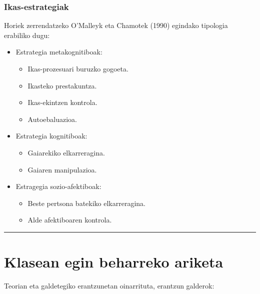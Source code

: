 \documentclass[]{book}
\providecommand{\tightlist}{%
  \setlength{\itemsep}{0pt}\setlength{\parskip}{0pt}}
\begin{document}
\hypertarget{ikas-estrategiak}{%
\subsubsection{Ikas-estrategiak}\label{ikas-estrategiak}}

Horiek zerrendatzeko O'Malleyk eta Chamotek (1990) egindako tipologia erabiliko dugu:

\begin{itemize}
\tightlist
\item
  Estrategia metakognitiboak:

  \begin{itemize}
  \tightlist
  \item
    Ikas-prozesuari buruzko gogoeta.
  \item
    Ikasteko prestakuntza.
  \item
    Ikas-ekintzen kontrola.
  \item
    Autoebaluazioa.
  \end{itemize}
\item
  Estrategia kognitiboak:

  \begin{itemize}
  \tightlist
  \item
    Gaiarekiko elkarreragina.
  \item
    Gaiaren manipulazioa.
  \end{itemize}
\item
  Estragegia sozio-afektiboak:

  \begin{itemize}
  \tightlist
  \item
    Beste pertsona batekiko elkarreragina.
  \item
    Alde afektiboaren kontrola.
  \end{itemize}
\end{itemize}

\begin{center}\rule{0.5\linewidth}{\linethickness}\end{center}

\hypertarget{klasean-egin-beharreko-ariketa}{%
\section*{Klasean egin beharreko ariketa}\label{klasean-egin-beharreko-ariketa}}

Teorian eta galdetegiko erantzunetan oinarrituta, erantzun galderok:
\end{document}
